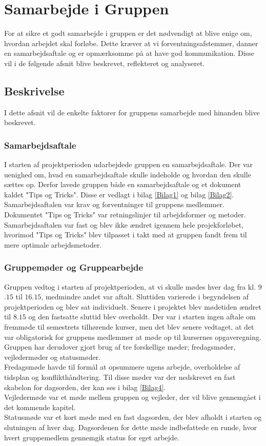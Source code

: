 \chapter{Samarbejde i Gruppen}
For at sikre et godt samarbejde i gruppen er det nødvendigt at blive enige om, hvordan arbejdet skal forløbe. Dette kræver at vi forventningsafstemmer, danner en samarbejdsaftale og er opmærksomme på at have god kommunikation. Disse vil i de følgende afsnit blive beskrevet, reflekteret og analyseret.

\section{Beskrivelse}
I dette afsnit vil de enkelte faktorer for gruppens samarbejde med hinanden blive beskrevet. 

\subsection{Samarbejdsaftale}
I starten af projektperioden udarbejdede gruppen en samarbejdsaftale. Der var uenighed om, hvad en samarbejdsaftale skulle indeholde og hvordan den skulle sættes op. Derfor lavede gruppen både en samarbejdsaftale og et dokument kaldet "Tips og Tricks". Disse er vedlagt i bilag \ref{Bilag1} og bilag \ref{Bilag2}. Samarbejdsaftalen var krav og forventninger til gruppens medlemmer. Dokumentet "Tips og Tricks" var retningslinjer til arbejdsformer og metoder. Samarbejdsaftalen var fast og blev ikke ændret igennem hele projekforløbet, hvorimod "Tips og Tricks" blev tilpasset i takt med at gruppen fandt frem til mere optimale arbejdsmetoder. 

\subsection{Gruppemøder og Gruppearbejde}
Gruppen vedtog i starten af projektperioden, at vi skulle mødes hver dag fra kl. $9$.$15$ til $16$.$15$, medmindre andet var aftalt. Sluttiden varierede i begyndelsen af projektperioden og blev sat individuelt. Senere i projektet blev mødetiden ændret til $8.15$ og den fastsatte sluttid blev overholdt. Der var i starten ingen aftale om fremmøde til semestrets tilhørende kurser, men det blev senere vedtaget, at det var obligatorisk for gruppens medlemmer at møde op til kursernes opgaveregning.
Gruppen har derudover gjort brug af tre forskellige møder; fredagsmøder, vejledermøder og statusmøder. \\
Fredagsmøde havde til formål at opsummere ugens arbejde, overholdelse af tidsplan og konflikthåndtering. Til disse møder var der nedskrevet en fast skabelon for dagsorden, der kan ses i bilag \ref{Bilag4}. \\
Vejledermøde var et møde mellem gruppen og vejleder, der vil blive gennemgået i det kommende kapitel. \\
Statusmøde var et kort møde med en fast dagsorden, der blev afholdt i starten og slutningen af hver dag. Dagsordenen for dette møde indbefattede en runde, hvor hvert gruppemedlem gennemgik status for eget arbejde.

